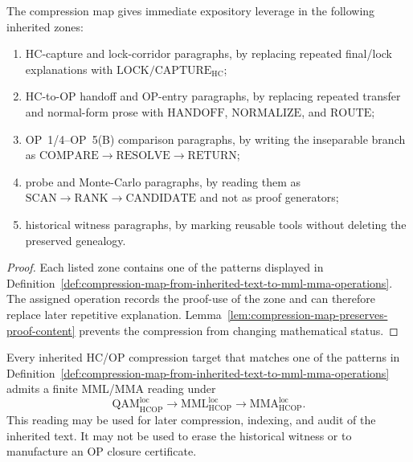 \begin{proposition}
\label{prop:main-inherited-text-zones-helped-by-compression-map}
The compression map gives immediate expository leverage in the following inherited zones:
\begin{enumerate}[leftmargin=2em,label=(\roman*)]
 \item HC-capture and lock-corridor paragraphs, by replacing repeated final/lock explanations with \(\mathrm{LOCK}/\mathrm{CAPTURE}_{\mathrm{HC}}\);
 \item HC-to-OP handoff and OP-entry paragraphs, by replacing repeated transfer and normal-form prose with \(\mathrm{HANDOFF}\), \(\mathrm{NORMALIZE}\), and \(\mathrm{ROUTE}\);
 \item OP~1/4--OP~5(B) comparison paragraphs, by writing the inseparable branch as \(\mathrm{COMPARE}\to\mathrm{RESOLVE}\to\mathrm{RETURN}\);
 \item probe and Monte-Carlo paragraphs, by reading them as \(\mathrm{SCAN}\to\mathrm{RANK}\to\mathrm{CANDIDATE}\) and not as proof generators;
 \item historical witness paragraphs, by marking reusable tools without deleting the preserved genealogy.
\end{enumerate}
\end{proposition}

\begin{proof}
Each listed zone contains one of the patterns displayed in Definition~\ref{def:compression-map-from-inherited-text-to-mml-mma-operations}. The assigned operation records the proof-use of the zone and can therefore replace later repetitive explanation. Lemma~\ref{lem:compression-map-preserves-proof-content} prevents the compression from changing mathematical status.
\end{proof}

\begin{theorem}
\label{thm:mml-mma-compression-theorem-for-inherited-hcop-text}
Every inherited HC/OP compression target that matches one of the patterns in Definition~\ref{def:compression-map-from-inherited-text-to-mml-mma-operations} admits a finite MML/MMA reading under
\[
 \mathrm{QAM}_{\mathrm{HCOP}}^{\mathrm{loc}}
 \longrightarrow
 \mathrm{MML}_{\mathrm{HCOP}}^{\mathrm{loc}}
 \longrightarrow
 \mathrm{MMA}_{\mathrm{HCOP}}^{\mathrm{loc}}.
\]
This reading may be used for later compression, indexing, and audit of the inherited text. It may not be used to erase the historical witness or to manufacture an OP closure certificate.
\end{theorem}

